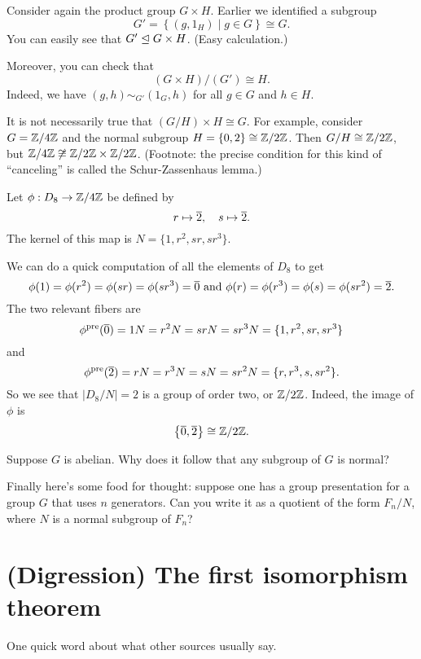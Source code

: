 \begin{example}
	Consider again the product group $G \times H$.
	Earlier we identified a subgroup
	\[ G' =  \left\{ (g, 1_H) \mid g \in G \right\} \cong G. \]
	You can easily see that $G' \trianglelefteq G \times H$.
	(Easy calculation.)

	Moreover, you can check that
	\[ (G \times H) / (G') \cong H. \]
	Indeed, we have $(g, h) \sim_{G'} (1_G, h)$ for all $g \in G$ and $h \in H$.
\end{example}
\begin{example}
	It is not necessarily true that $(G/H) \times H \cong G$.
	For example, consider $G = \mathbb Z/4\mathbb Z$
	and the normal subgroup $H = \{0,2\} \cong \mathbb Z/2\mathbb Z$.
	Then $G/H \cong \mathbb Z/2\mathbb Z$,
	but $\mathbb Z/4\mathbb Z \not\cong \mathbb Z/2\mathbb Z \times \mathbb Z/2\mathbb Z$.
	(Footnote: the precise condition for this kind of ``canceling'' is called the Schur-Zassenhaus lemma.)
\end{example}
\begin{example}
	Let $\phi: D_8 \to \mathbb Z/4\mathbb Z$ be defined by \[ r \mapsto \overline 2, \quad s \mapsto \overline 2. \] 
	The kernel of this map is $N = \{1,r^2,sr,sr^3\}$.

	We can do a quick computation of all the elements of $D_8$ to get
	\[ \phi(1) = \phi(r^2) = \phi(sr) = \phi(sr^3) = \overline 0 
	\text{ and }
	 \phi(r) = \phi(r^3) = \phi(s) = \phi(sr^2) = \overline 2. \]
	The two relevant fibers are \[ \phi^{\text{pre}}(\overline 0) = 1N = r^2N = srN = sr^3N = \{1,r^2,sr,sr^3\} \] and 
	\[ \phi^{\text{pre}}(\overline 2) = rN = r^3N = sN = sr^2N = \{r,r^3,s,sr^2\}. \]
	So we see that $|D_8/N| = 2$ is a group of order two, or $\mathbb Z/2\mathbb Z$.
	Indeed, the image of $\phi$ is \[ \left\{ \overline 0, \overline 2 \right\} \cong \mathbb Z/2\mathbb Z. \]
\end{example}

\begin{ques}
	Suppose $G$ is abelian.
	Why does it follow that any subgroup of $G$ is normal?
\end{ques}


Finally here's some food for thought:
suppose one has a group presentation for a group $G$
that uses $n$ generators.
Can you write it as a quotient of the form $F_n / N$,
where $N$ is a normal subgroup of $F_n$?

\section{(Digression) The first isomorphism theorem}
One quick word about what other sources usually say.

